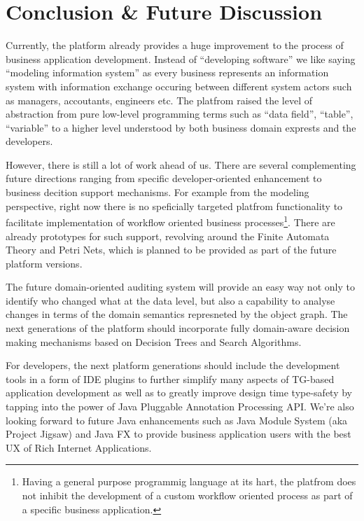 \section{Conclusion \& Future Discussion}\label{sec:08}

  Currently, the platform already provides a huge improvement to the process of business application development.
  Instead of ``developing software'' we like saying ``modeling information system'' as every business represents an information system with information exchange occuring between different system actors such as managers, accoutants, engineers etc.
  The platfrom raised the level of abstraction from pure low-level programming terms such as ``data field'', ``table'', ``variable'' to a higher level understood by both business domain exprests and the developers.
  
  However, there is still a lot of work ahead of us.
  There are several complementing future directions ranging from specific developer-oriented enhancement to business decition support mechanisms.
  For example from the modeling perspective, right now there is no speficially targeted platfrom functionality to facilitate implementation of workflow oriented business processes\footnote{Having a general purpose programmig language at its hart, the platfrom does not inhibit the development of a custom workflow oriented process as part of a specific business application.}.
  There are already prototypes for such support, revolving around the Finite Automata Theory and Petri Nets, which is planned to be provided as part of the future platform versions.
  
  The future domain-oriented auditing system will provide an easy way not only to identify who changed what at the data level, but also a capability to analyse changes in terms of the domain semantics represneted by the object graph.  
  The next generations of the platform should incorporate fully domain-aware decision making mechanisms based on Decision Trees and Search Algorithms.

  For developers, the next platform generations should include the development tools in a form of IDE plugins to further simplify many aspects of TG-based application development as well as to greatly improve design time type-safety by tapping into the power of Java Pluggable Annotation Processing API.
  We're also looking forward to future Java enhancements such as Java Module System (aka Project Jigsaw) and Java FX to provide business application users with the best UX of Rich Internet Applications.